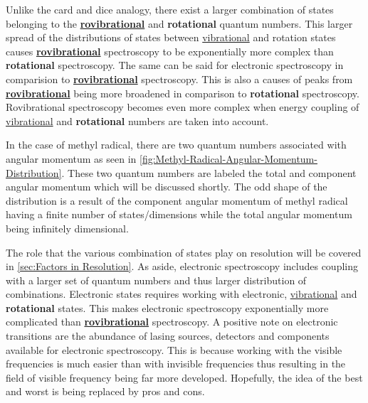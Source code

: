 \documentclass[11pt,a4paper]{book}
\begin{document}
		Unlike the card and dice analogy, there exist a larger combination of states belonging to the \underline{\textbf{rovibrational}} and \textbf{rotational} quantum numbers. This larger spread of the distributions of states between \underline{vibrational} and rotation states causes \underline{\textbf{rovibrational}} spectroscopy to be exponentially more complex than \textbf{rotational} spectroscopy. The same can be said for electronic spectroscopy in comparision to \underline{\textbf{rovibrational}} spectroscopy. This is also a causes of peaks from \underline{\textbf{rovibrational}} being more broadened in comparison to \textbf{rotational} spectroscopy. Rovibrational spectroscopy becomes even more complex when energy coupling of \underline{vibrational} and \textbf{rotational} numbers are taken into account. 
		
		In the case of methyl radical, there are two quantum numbers associated with angular momentum as seen in \autoref{fig:Methyl-Radical-Angular-Momentum-Distribution}. These two quantum numbers are labeled the total and component angular momentum which will be discussed shortly. The odd shape of the distribution is a result of the component angular momentum of methyl radical having a finite number of states/dimensions while the total angular momentum being infinitely dimensional. %
		
		The role that the various combination of states play on resolution will be covered in \autoref{sec:Factors in Resolution}. As aside, electronic spectroscopy includes coupling with a larger set of quantum numbers and thus larger distribution of combinations. Electronic states requires working with electronic, \underline{vibrational} and \textbf{rotational} states. This makes electronic spectroscopy exponentially more complicated than \underline{\textbf{rovibrational}} spectroscopy. A positive note on electronic transitions are the abundance of lasing sources, detectors and components available for electronic spectroscopy. This is because working with the visible frequencies is much easier than with invisible frequencies thus resulting in the field of visible frequency being far more developed. Hopefully, the idea of the best and worst is being replaced by pros and cons.
		
\end{document}
